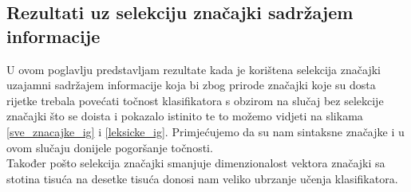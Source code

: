 \subsection{Rezultati uz selekciju značajki sadržajem informacije}

U ovom poglavlju predstavljam rezultate kada je korištena selekcija značajki uzajamni sadržajem informacije koja bi zbog prirode značajki koje su dosta rijetke trebala povećati točnost klasifikatora s obzirom na slučaj bez selekcije značajki što se doista i pokazalo istinito te to možemo vidjeti na slikama \ref{sve_znacajke_ig} i \ref{leksicke_ig}. Primjećujemo da su nam sintaksne značajke i u ovom slučaju donijele pogoršanje točnosti. \\
	Također pošto selekcija značajki smanjuje dimenzionalost vektora značajki sa stotina tisuća na desetke tisuća donosi nam veliko ubrzanje učenja klasifikatora.

